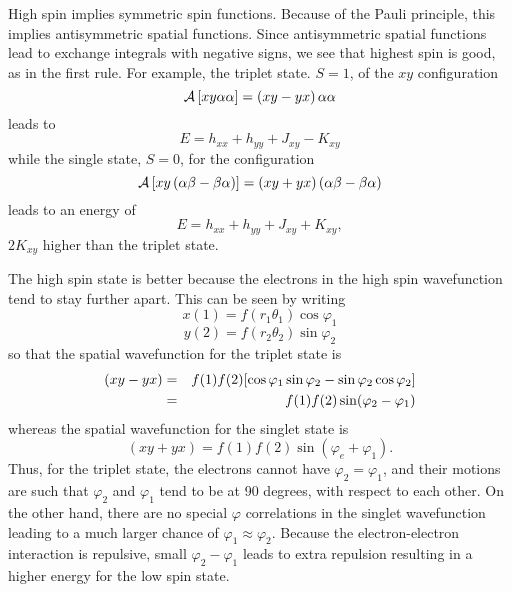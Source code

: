 High spin implies symmetric spin functions.  Because of the Pauli 
principle, this implies antisymmetric spatial functions.  Since 
antisymmetric spatial functions lead to exchange integrals with negative 
signs, we see that highest spin is good, as in the first
rule. For example, the triplet state. $S = 1$, of the $xy$ configuration
\begin{equation}
{\cal A} \left[ xy \alpha \alpha \right] = \left( xy - yx \right) 
\alpha \alpha
\end{equation}
leads to
\begin{equation}
E = h_{xx} + h_{yy} + J_{xy} - K_{xy}
\end{equation}
while the single state, $S = 0$, for the configuration
\begin{equation}
{\cal A} \left[ xy \left( \alpha \beta - \beta \alpha \right) 
\right] = \left( xy + yx \right) \left( \alpha \beta - \beta \alpha 
\right)
\end{equation}
leads to an energy of
\begin{equation}
E = h_{xx} + h_{yy} + J_{xy} + K_{xy} ,
\end{equation}
$2K_{xy}$ higher than the triplet state.

The high spin state is better because the electrons in the high spin wavefunction
tend to stay further apart.  This can be seen by writing
\begin{equation}
x(1) = f ( r_1 \theta_1 ) \cos \varphi_1
\label{chap5-eqno20a}
\end{equation}
\begin{equation}
y(2) = f (r_2 \theta_2 ) \sin \varphi_2
\label{chap5-eqno20b}
\end{equation}
so that the spatial wavefunction for the triplet state is
\begin{eqnarray}
(xy-yx) &=& f(1) f(2) [ \cos \varphi_1 \sin \varphi_2 - \sin \varphi_2 
\cos \varphi_2 ]\cr
&=& f(1) f(2) \sin ( \varphi_2 - \varphi_1 )
\end{eqnarray}
whereas the spatial wavefunction for the singlet state is
\begin{equation}
(xy + yx ) = f (1) f(2) \sin ( \varphi_e + \varphi_1 ).
\end{equation}
Thus, for the triplet state, the electrons cannot have $\varphi_2 = 
\varphi_1$, and their motions are such that $\varphi_2$ and 
$\varphi_1$ tend to be at 90 degrees, with respect to each other.  On the 
other hand, there are no special $\varphi$ correlations in the singlet 
wavefunction leading to a much larger chance of $\varphi_1 \approx 
\varphi_2$.  Because the electron-electron interaction is repulsive, small 
$\varphi_2 - \varphi_1$ leads to extra repulsion resulting in a higher 
energy for the low spin state.

